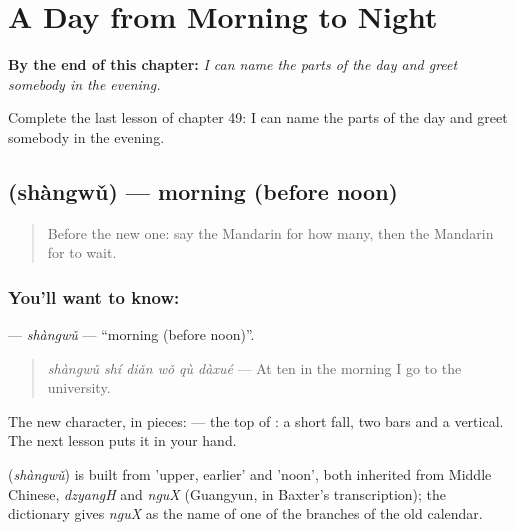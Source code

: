 
\chapter{A Day from Morning to Night}
\label{ch:zh-a-day-from-morning-to-night}

\begin{chapteropening}
\textbf{By the end of this chapter:} \emph{I can name the parts of the day and greet somebody in the evening.}

Complete the last lesson of chapter 49: I can name the parts of the day and greet somebody in the evening.
\end{chapteropening}

\section[\texorpdfstring{\zh{上午} (shàngwǔ)}{上午 (shàngwǔ)}]{ (shàngwǔ) — morning (before noon)}

\label{lesson:ZH-C49-shangwu}



\begin{quote}
Before the new one: say the Mandarin for how many, then the Mandarin for to wait.
\end{quote}

\subsection*{You'll want to know: }
\textbf{} — \emph{shàngwǔ} — \textquotedblleft{}morning (before noon)\textquotedblright{}.

\begin{quote}
\textbf{} \emph{shàngwǔ shí diǎn wǒ qù dàxué} — At ten in the morning I go to the university.
\end{quote}

The new character, in pieces:  — the top of : a short fall, two bars and a vertical. The next lesson puts it in your hand.

\begin{cousinweb}
\textbf{} (\emph{shàngwǔ}) is built from  'upper, earlier' and  'noon', both inherited from Middle Chinese, \emph{dzyangH} and \emph{nguX} (Guangyun, in Baxter's transcription); the dictionary gives \emph{nguX} as the name of one of the branches of the old calendar.
\end{cousinweb}


